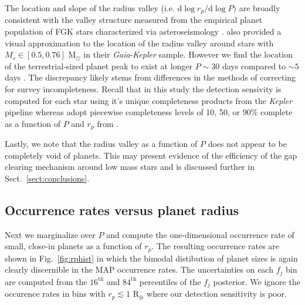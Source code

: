 \documentclass[twocolumn]{emulateapj}
\newcommand{\gaia}[1]{\emph{Gaia}#1}
\newcommand{\kepler}[1]{\emph{Kepler}#1}
\begin{document}
The location and slope of the radius valley (i.e. $\text{d}\log{r_p}/\text{d}\log{P})$ are broadly consistent
with the valley structure measured from the empirical planet population of FGK stars characterized via
asteroseismology \citep{vaneylen18}. \cite{wu19} also provided a visual approximation to the location of the
radius valley around stars with $M_s \in [0.5,0.76]$ M$_{\odot}$ in their \gaia{-}\kepler{} sample. However
we find the location of the terrestrial-sized planet peak to exist at longer $P \sim 30$ days compared to
$\sim 5$ days \citep[c.f. Fig. 2,][]{wu19}. The discrepancy likely stems from differences in the methods of
correcting for survey incompleteness. Recall that in this study the detection sensivity is computed for each
star using it's unique completeness products from the \kepler{} pipeline whereas \cite{wu19} adopt piecewise
completeness levels of 10, 50, or 90\% complete as a function of $P$ and $r_p$ from \cite{zhu18b}.  

Lastly, we note that the radius valley as a function of $P$ does not appear to be completely void of planets.
This may present evidence of the efficiency of the gap clearing mechanism around low mass stars and is
discussed further in Sect.~\ref{sect:conclusions}.

\subsection{Occurrence rates versus planet radius}
Next we marginalize over $P$ and compute the one-dimensional occurrence rate of small, close-in planets
as a function of $r_p$. The resulting occurrence rates are shown in Fig.~\ref{fig:rphist} in which the bimodal
distibution of planet sizes is again clearly discernible in the MAP occurrence rates.
The uncertainties on each $f_j$ bin are computed from the $16^{\text{th}}$ and $84^{\text{th}}$ percentiles
of the $f_j$ posterior. We ignore the occurence rates in bins with $r_p\lesssim 1$ R$_{\oplus}$ where our
detection sensitivity is poor.
\end{document}
